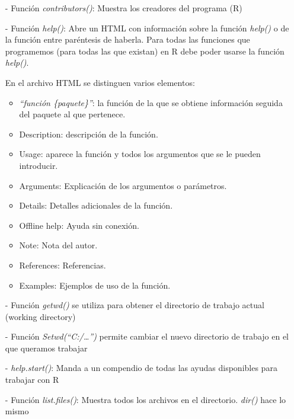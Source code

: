 \documentclass[a4paper, 12pt]{article}
\begin{document}
        \begin{itemize}
            \item[-]Función \emph{contributors()}: Muestra los creadores del programa (R)
            
            \item[-]Función \emph{help()}: Abre un HTML con información sobre la función \emph{help()} o de la función entre paréntesis de haberla. Para todas las funciones que programemos (para todas las que existan) en R debe poder usarse la función \emph{help()}.
            
            En el archivo HTML se distinguen varios elementos:
            
            \begin{itemize}
                \item \emph{\textquotedblleft función \{paquete\}\textquotedblright}: la función de la que se obtiene información seguida del paquete al que pertenece.
                \item Description: descripción de la función.
                \item Usage: aparece la función y todos los argumentos que se le pueden introducir.
                \item Arguments: Explicación de los argumentos o parámetros.
                \item Details: Detalles adicionales de la función.
                \item Offline help: Ayuda sin conexión.
                \item Note: Nota del autor.
                \item References: Referencias.
                \item Examples: Ejemplos de uso de la función.
            \end{itemize}
            
            \item[-]Función \emph{getwd()} se utiliza para obtener el directorio de trabajo actual (working directory)
            
            \item[-]Función \emph{Setwd(“C:/…”)} permite cambiar el nuevo directorio de trabajo en el que queramos trabajar
            
            \item[-] \emph{help.start()}: Manda a un compendio de todas las ayudas disponibles para trabajar con R
            
            \item[-]Función \emph{list.files()}: Muestra todos los archivos en el directorio. \emph{dir()} hace lo mismo    
        \end{itemize}
        
\end{document}
